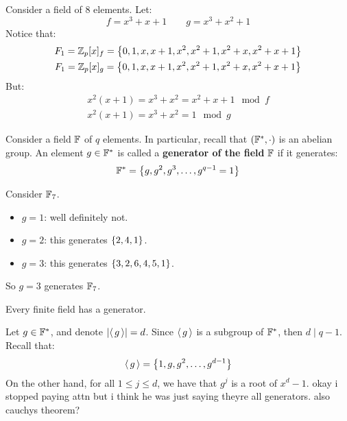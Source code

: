 \documentclass{article}
\begin{document}
\begin{xmp}[source=Primary Source Material]
    Consider a field of $ 8 $ elements. Let:
    \begin{equation*}
        f = x^{3} + x + 1 \qquad g = x^{3} + x^{2} + 1
    \end{equation*}
    Notice that:
    \begin{gather*}
        F_{1} = \mathbb{Z}_{p}[x]_{f}
        = \left\{{0, 1, x, x + 1, x^{2}, x^{2} + 1, x^{2} + x, x^{2} + x + 1}\right\} \\
        F_{1} = \mathbb{Z}_{p}[x]_{g}
        = \left\{{0, 1, x, x + 1, x^{2}, x^{2} + 1, x^{2} + x, x^{2} + x + 1}\right\}
    \end{gather*}
    But:
    \begin{gather*}
        x^{2}(x + 1) = x^{3} + x^{2} = x^{2} + x + 1 \mod f \\
        x^{2}(x + 1) = x^{3} + x^{2} = 1 \mod g
    \end{gather*}
\end{xmp}

\begin{defn}
    Consider a field $ \mathbb{F} $ of $ q $ elements.
    In particular, recall that $ (\mathbb{F}^{*}, \cdot) $ is an abelian group. \vsp
    An element $ g \in \mathbb{F}^{*} $ is called a \textbf{generator of the field} $ \mathbb{F} $ if
    it generates:
    \begin{equation*}
        \mathbb{F}^{*} = \left\{{g, g^{2}, g^{3}, \dots, g^{q - 1} = 1}\right\}
    \end{equation*}
\end{defn}

\begin{xmp}[source=Primary Source Material]
    Consider $ \mathbb{F}_{7} $.
    \begin{itemize}
        \item $ g = 1 $: well definitely not.
        \item $ g = 2 $: this generates $ \left\{{2, 4, 1}\right\} $.
        \item $ g = 3 $: this generates $ \left\{{3, 2, 6, 4, 5, 1}\right\} $.
    \end{itemize}
    So $ g = 3 $ generates $ \mathbb{F}_{7} $.
\end{xmp}

\begin{thm}
    Every finite field has a generator.
\end{thm}

\begin{pf}[source=Primary Source Material]
    Let $ g \in \mathbb{F}^{*} $, and denote $ \abs{\operatorname{\langle} g \operatorname{\rangle}} = d $.
    Since $ \operatorname{\langle} g \operatorname{\rangle} $ is a subgroup of $ \mathbb{F}^{*} $, then $ d \mid q - 1 $. \vsp
    Recall that:
    \begin{equation*}
        \operatorname{\langle} g \operatorname{\rangle} = \left\{{1, g, g^{2}, \dots, g^{d - 1}}\right\}
    \end{equation*}
    On the other hand, for all $ 1 \leq j \leq d $, we have that $ g^{j} $ is a root of
    $ x^{d} - 1 $. \vsp
    okay i stopped paying attn but i think he was just saying theyre all generators.
    also cauchys theorem?
\end{pf}
\end{document}
